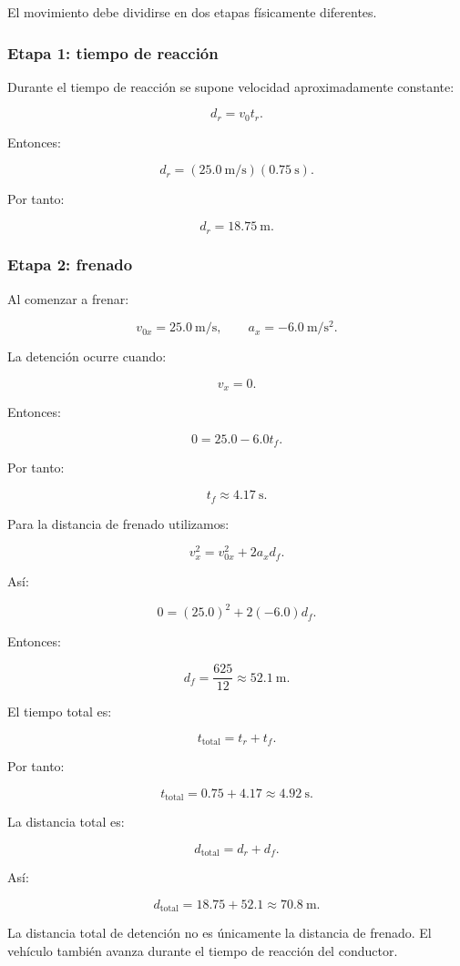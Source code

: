 \begin{explicacion}
El movimiento debe dividirse en dos etapas físicamente diferentes.

\subsubsection*{Etapa 1: tiempo de reacción}

Durante el tiempo de reacción se supone velocidad aproximadamente constante:

\[
d_r=v_0t_r.
\]

Entonces:

\[
d_r
=
(\SI{25.0}{\meter\per\second})
(\SI{0.75}{\second}).
\]

Por tanto:

\[ \boxed{d_r=\SI{18.75}{\meter}}. \]

\subsubsection*{Etapa 2: frenado}

Al comenzar a frenar:

\[
v_{0x}=\SI{25.0}{\meter\per\second},
\qquad
a_x=-\SI{6.0}{\meter\per\second\squared}.
\]

La detención ocurre cuando:

\[ v_x=0. \]

Entonces:

\[
0
=
25.0-6.0t_f.
\]

Por tanto:

\[
\boxed{t_f\approx\SI{4.17}{\second}}.
\]

Para la distancia de frenado utilizamos:

\[
v_x^2=v_{0x}^2+2a_xd_f.
\]

Así:

\[
0
=
(25.0)^2
+
2(-6.0)d_f.
\]

Entonces:

\[
d_f
=
\frac{625}{12}
\approx
\boxed{\SI{52.1}{\meter}}.
\]

El tiempo total es:

\[
t_{\mathrm{total}}
=
t_r+t_f.
\]

Por tanto:

\[
t_{\mathrm{total}}
=
0.75+4.17
\approx
\boxed{\SI{4.92}{\second}}.
\]

La distancia total es:

\[
d_{\mathrm{total}}
=
d_r+d_f.
\]

Así:

\[
d_{\mathrm{total}}
=
18.75+52.1
\approx
\boxed{\SI{70.8}{\meter}}.
\]

La distancia total de detención no es únicamente la distancia de frenado. El vehículo también avanza durante el tiempo de reacción del conductor.
\end{explicacion}


